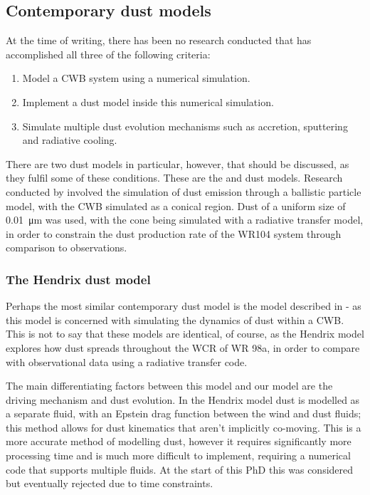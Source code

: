 \subsection{Contemporary dust models}

At the time of writing, there has been no research conducted that has accomplished all three of the following criteria:

\begin{enumerate}
  \item Model a CWB system using a numerical simulation.
  \item Implement a dust model inside this numerical simulation.
  \item Simulate multiple dust evolution mechanisms such as accretion, sputtering and radiative cooling.
\end{enumerate}

\noindent
There are two dust models in particular, however, that should be discussed, as they fulfil some of these conditions.
These are the \textcite{harriesThreedimensionalDustRadiativetransfer2004} and \textcite{hendrix_pinwheels_2016} dust models.
Research conducted by \textcite{harriesThreedimensionalDustRadiativetransfer2004} involved the simulation of dust emission through a ballistic particle model, with the CWB simulated as a conical region.
Dust of a uniform size of \SI{0.01}{\micro\metre} was used, with the cone being simulated with a radiative transfer model, in order to constrain the dust production rate of the WR104 system through comparison to observations.

\subsubsection{The Hendrix dust model}
\label{sec:hendrixmodel}

Perhaps the most similar contemporary dust model is the model described in \textcite{hendrix_pinwheels_2016} - as this model is concerned with simulating the dynamics of dust within a CWB.
This is not to say that these models are identical, of course, as the Hendrix model explores how dust spreads throughout the WCR of WR 98a, in order to compare with observational data using a radiative transfer code.


The main differentiating factors between this model and our model are the driving mechanism and dust evolution.
In the Hendrix model dust is modelled as a separate fluid, with an Epstein drag function between the wind and dust fluids; this method allows for dust kinematics that aren't implicitly co-moving.
This is a more accurate method of modelling dust, however it requires significantly more processing time and is much more difficult to implement, requiring a numerical code that supports multiple fluids.
At the start of this PhD this was considered but eventually rejected due to time constraints.


